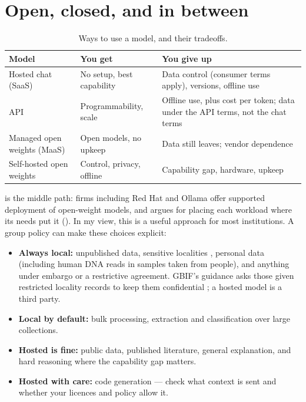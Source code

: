 \section{Open, closed, and in between}

\begin{table}[htbp]
\centering
\caption{Ways to use a model, and their tradeoffs.}
\label{tab:deployment}
\small
\begin{tabularx}{\textwidth}{lXX}
\toprule
\textbf{Model} & \textbf{You get} & \textbf{You give up} \\
\midrule
Hosted chat (SaaS) & No setup, best capability & Data control (consumer terms apply), versions, offline use \\
API & Programmability, scale & Offline use, plus cost per token; data under the API terms, not the chat terms \\
Managed open weights (MaaS) & Open models, no upkeep & Data still leaves; vendor dependence \\
Self-hosted open weights & Control, privacy, offline & Capability gap, hardware, upkeep \\
\bottomrule
\end{tabularx}
\end{table}

 is the middle path: firms including Red Hat and Ollama
offer supported deployment of open-weight models, and \textcite{redhat2026hybrid}
argues for placing each workload where its needs put it (). In my view, this is a
useful approach for most institutions. A group policy can make these choices
explicit:

\begin{itemize}
  \item \textbf{Always local:} unpublished data, sensitive localities
    \parencite{tulloch2018sensitive,fox2025safeguarding}, personal data
    (including human DNA reads in samples taken from people), and anything
    under embargo or a restrictive agreement. GBIF's guidance asks those given
    restricted locality records to keep them confidential
    \parencite{chapman2020sensitive}; a hosted model is a third party.
  \item \textbf{Local by default:} bulk processing, extraction and
    classification over large collections.
  \item \textbf{Hosted is fine:} public data, published literature, general
    explanation, and hard reasoning where the capability gap matters.
  \item \textbf{Hosted with care:} code generation --- check what context is
    sent and whether your licences and policy allow it.
\end{itemize}

